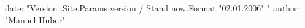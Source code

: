 date: "Version {{ .Site.Params.version }} / Stand {{ now.Format "02.01.2006" }}"
author: "Manuel Huber"